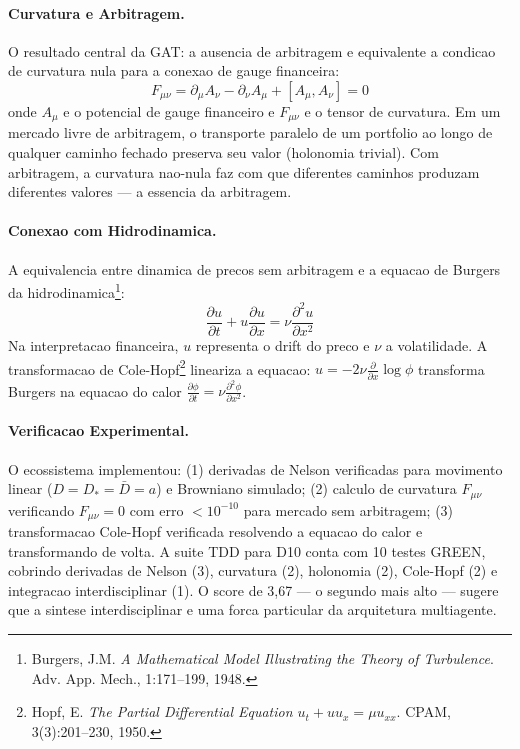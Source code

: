 \paragraph{Curvatura e Arbitragem.}

O resultado central da GAT: a ausencia de arbitragem e equivalente a
condicao de curvatura nula para a conexao de gauge financeira:
\[
F_{\mu\nu} = \partial_\mu A_\nu - \partial_\nu A_\mu +
[A_\mu, A_\nu] = 0
\]
onde $A_\mu$ e o potencial de gauge financeiro e $F_{\mu\nu}$ e o tensor
de curvatura. Em um mercado livre de arbitragem, o transporte paralelo de
um portfolio ao longo de qualquer caminho fechado preserva seu valor
(holonomia trivial). Com arbitragem, a curvatura nao-nula faz com que
diferentes caminhos produzam diferentes valores --- a essencia da
arbitragem.

\paragraph{Conexao com Hidrodinamica.}

A equivalencia entre dinamica de precos sem arbitragem e a equacao de
Burgers da hidrodinamica\footnote{Burgers, J.M. \textit{A Mathematical
Model Illustrating the Theory of Turbulence}. Adv. App. Mech., 1:171--199,
1948.}:
\[
\frac{\partial u}{\partial t} + u \frac{\partial u}{\partial x} =
\nu \frac{\partial^2 u}{\partial x^2}
\]
Na interpretacao financeira, $u$ representa o drift do preco e $\nu$ a
volatilidade. A transformacao de Cole-Hopf\footnote{Hopf, E. \textit{The
Partial Differential Equation $u_t + uu_x = \mu u_{xx}$}. CPAM,
3(3):201--230, 1950.} lineariza a equacao: $u = -2\nu
\frac{\partial}{\partial x} \log \phi$ transforma Burgers na equacao
do calor $\frac{\partial \phi}{\partial t} = \nu \frac{\partial^2
\phi}{\partial x^2}$.

\paragraph{Verificacao Experimental.}

O ecossistema implementou: (1) derivadas de Nelson verificadas para
movimento linear ($D=D_*=\bar{D}=a$) e Browniano simulado; (2) calculo
de curvatura $F_{\mu\nu}$ verificando $F_{\mu\nu}=0$ com erro $<10^{-10}$
para mercado sem arbitragem; (3) transformacao Cole-Hopf verificada
resolvendo a equacao do calor e transformando de volta. A suite TDD
para D10 conta com 10 testes GREEN, cobrindo derivadas de Nelson (3),
curvatura (2), holonomia (2), Cole-Hopf (2) e integracao interdisciplinar
(1). O score de 3,67 --- o segundo mais alto --- sugere que a sintese
interdisciplinar e uma forca particular da arquitetura multiagente.

